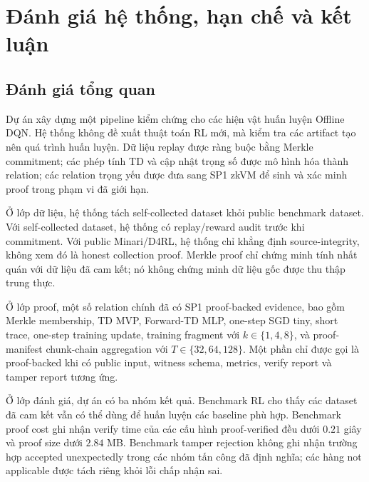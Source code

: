 \documentclass[12pt,a4paper,oneside]{report}
\begin{document}
\chapter{Đánh giá hệ thống, hạn chế và kết luận}

\section{Đánh giá tổng quan}

Dự án xây dựng một pipeline kiểm chứng cho các hiện vật huấn luyện Offline DQN. Hệ thống không đề xuất thuật toán RL mới, mà kiểm tra các artifact tạo nên quá trình huấn luyện. Dữ liệu replay được ràng buộc bằng Merkle commitment; các phép tính TD và cập nhật trọng số được mô hình hóa thành relation; các relation trọng yếu được đưa sang SP1 zkVM để sinh và xác minh proof trong phạm vi đã giới hạn.

Ở lớp dữ liệu, hệ thống tách self-collected dataset khỏi public benchmark dataset. Với self-collected dataset, hệ thống có replay/reward audit trước khi commitment. Với public Minari/D4RL, hệ thống chỉ khẳng định source-integrity, không xem đó là honest collection proof. Merkle proof chỉ chứng minh tính nhất quán với dữ liệu đã cam kết; nó không chứng minh dữ liệu gốc được thu thập trung thực.

Ở lớp proof, một số relation chính đã có SP1 proof-backed evidence, bao gồm Merkle membership, TD MVP, Forward-TD MLP, one-step SGD tiny, short trace, one-step training update, training fragment với \(k \in \{1,4,8\}\), và proof-manifest chunk-chain aggregation với \(T \in \{32,64,128\}\). Một phần chỉ được gọi là proof-backed khi có public input, witness schema, metrics, verify report và tamper report tương ứng.

Ở lớp đánh giá, dự án có ba nhóm kết quả. Benchmark RL cho thấy các dataset đã cam kết vẫn có thể dùng để huấn luyện các baseline phù hợp. Benchmark proof cost ghi nhận verify time của các cấu hình proof-verified đều dưới \(0.21\) giây và proof size dưới \(2.84\) MB. Benchmark tamper rejection không ghi nhận trường hợp accepted unexpectedly trong các nhóm tấn công đã định nghĩa; các hàng not applicable được tách riêng khỏi lỗi chấp nhận sai.
\end{document}
